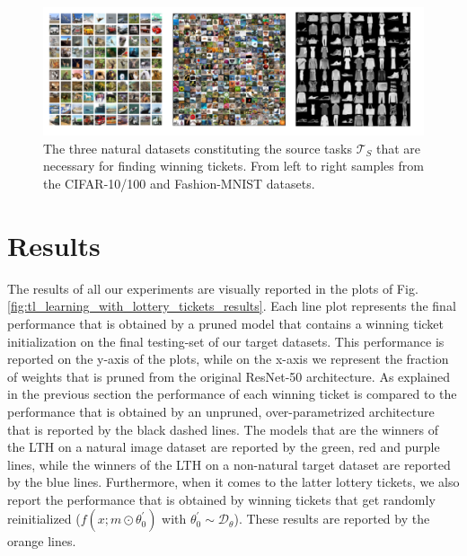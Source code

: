 \begin{figure}
  \centering
   \includegraphics[width=\linewidth,height=\textheight,keepaspectratio]{./Images/Chapter06/natural_datasets.png}
   \caption{The three natural datasets constituting the source tasks $\mathcal{T}_S$ that are necessary for finding winning tickets. From left to right samples from the CIFAR-10/100 and Fashion-MNIST datasets.}
\label{fig:natural_source_datasets}
\end{figure}


\section{Results}
\label{sec:results}
The results of all our experiments are visually reported in the plots of Fig. \ref{fig:tl_learning_with_lottery_tickets_results}. Each line plot represents the final performance that is obtained by a pruned model that contains a winning ticket initialization on the final testing-set of our target datasets. This performance is reported on the y-axis of the plots, while on the x-axis we represent the fraction of weights that is pruned from the original ResNet-50 architecture. As explained in the previous section the performance of each winning ticket is compared to the performance that is obtained by an unpruned, over-parametrized architecture that is reported by the black dashed lines. The models that are the winners of the LTH on a natural image dataset are reported by the green, red and purple lines, while the winners of the LTH on a non-natural target dataset are reported by the blue lines. Furthermore, when it comes to the latter lottery tickets, we also report the performance that is obtained by winning tickets that get randomly reinitialized ($f(x;m\odot\theta^{'}_{0})$ with $\theta^{'}_{0} \sim \mathcal{D}_\theta$). These results are reported by the orange lines. 

